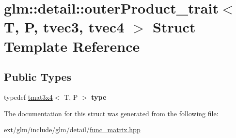 \hypertarget{structglm_1_1detail_1_1outer_product__trait_3_01_t_00_01_p_00_01tvec3_00_01tvec4_01_4}{\section{glm\-:\-:detail\-:\-:outer\-Product\-\_\-trait$<$ T, P, tvec3, tvec4 $>$ Struct Template Reference}
\label{structglm_1_1detail_1_1outer_product__trait_3_01_t_00_01_p_00_01tvec3_00_01tvec4_01_4}
}
\subsection*{Public Types}
\begin{DoxyCompactItemize}
\item 
\hypertarget{structglm_1_1detail_1_1outer_product__trait_3_01_t_00_01_p_00_01tvec3_00_01tvec4_01_4_a14958bc1241fffaf223abab70496c56d}{typedef \hyperlink{structglm_1_1tmat3x4}{tmat3x4}$<$ T, P $>$ {\bfseries type}}\label{structglm_1_1detail_1_1outer_product__trait_3_01_t_00_01_p_00_01tvec3_00_01tvec4_01_4_a14958bc1241fffaf223abab70496c56d}

\end{DoxyCompactItemize}


The documentation for this struct was generated from the following file\-:\begin{DoxyCompactItemize}
\item 
ext/glm/include/glm/detail/\hyperlink{func__matrix_8hpp}{func\-\_\-matrix.\-hpp}\end{DoxyCompactItemize}
